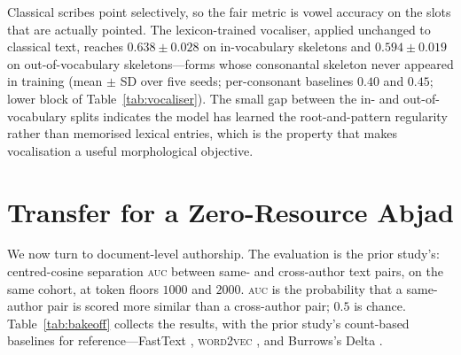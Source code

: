 \documentclass[11pt]{article}
\newcommand{\auc}{\textsc{auc}}
\begin{document}
Classical scribes point selectively, so the fair metric is vowel accuracy on the
slots that are actually pointed. The lexicon-trained vocaliser, applied unchanged
to classical text, reaches $0.638\pm0.028$ on in-vocabulary skeletons and
$0.594\pm0.019$ on out-of-vocabulary skeletons---forms whose consonantal skeleton
never appeared in training (mean $\pm$ SD over five seeds; per-consonant baselines
$0.40$ and $0.45$; lower block of Table~\ref{tab:vocaliser}). The small gap between
the in- and out-of-vocabulary splits indicates the model has learned the
root-and-pattern regularity rather than memorised lexical entries, which is the
property that makes vocalisation a useful morphological objective.

\begin{table}[t]
  \centering
  
  \caption{The vocaliser on held-out SEDRA lexicon forms (upper) and on classical
  DSC text (lower). Cross-register figures are vowel accuracy on pointed slots,
  mean $\pm$ SD over five seeds; the out-of-vocabulary split contains consonantal
  skeletons unseen in training.}
  \label{tab:vocaliser}
\end{table}

\begin{table}[t]
  \centering
  
  \caption{The Unicode-point$\to$CAL-vowel mapping \emph{derived from data} by
  aligning DSC tokens to uniquely-vocalised SEDRA skeletons. Marks accepted as
  vowels are starred; reading and grammatical marks (not shown) fall below the
  majority threshold and are treated as unvocalised.}
  \label{tab:vowelmap}
\end{table}

\section{Transfer for a Zero-Resource Abjad}
\label{sec:transfer}

We now turn to document-level authorship. The evaluation is the prior study's:
centred-cosine separation \auc{} between same- and cross-author text pairs, on the
same cohort, at token floors $1000$ and $2000$. \auc{} is the probability that a
same-author pair is scored more similar than a cross-author pair; $0.5$ is chance.
Table~\ref{tab:bakeoff} collects the results, with the prior study's count-based
baselines for reference---FastText \citep{bojanowski2017enriching},
\textsc{word2vec} \citep{mikolov2013distributed}, and Burrows's Delta
\citep{burrows2002delta}.
\end{document}
